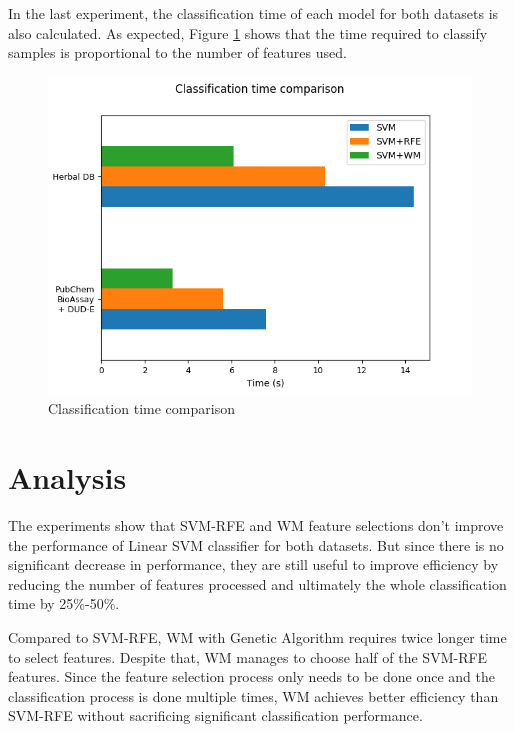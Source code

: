 \documentclass[conference,compsoc,12pt]{IEEEtran}
\begin{document}
	In the last experiment, the classification time of each model for both datasets is also calculated. As expected, Figure \ref{fig_classification_time_comparison} shows that the time required to classify samples is proportional to the number of features used.
		
	\begin{figure}
		\includegraphics[scale=0.5]{../images/classification_time_comparison.png}
		\caption{Classification time comparison}
		\label{fig_classification_time_comparison}
	\end{figure}
	
	\section{Analysis}

	The experiments show that SVM-RFE and WM feature selections don't improve the performance of Linear SVM classifier for both datasets. But since there is no significant decrease in performance, they are still useful to improve efficiency by reducing the number of features processed and ultimately the whole classification time by 25\%-50\%.
	
	Compared to SVM-RFE, WM with Genetic Algorithm requires twice longer time to select features. Despite that, WM manages to choose half of the SVM-RFE features. Since the feature selection process only needs to be done once and the classification process is done multiple times, WM achieves better efficiency than SVM-RFE without sacrificing significant classification performance.
		
\end{document}
